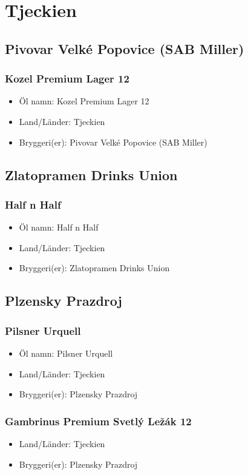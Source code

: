 \documentclass[11pt]{article}
\begin{document}
\section{Tjeckien}
\label{sec:orgdc9c26a}
\subsection{Pivovar Velké Popovice (SAB Miller)}
\label{sec:org4dc39b1}
\subsubsection{Kozel Premium Lager 12}
\label{sec:orgaa73ccb}
\begin{itemize}
\item Öl namn: Kozel Premium Lager 12
\item Land/Länder: Tjeckien
\item Bryggeri(er): Pivovar Velké Popovice (SAB Miller)
\end{itemize}
\subsection{Zlatopramen Drinks Union}
\label{sec:org5eb4bfa}
\subsubsection{Half n Half}
\label{sec:org48162a9}
\begin{itemize}
\item Öl namn: Half n Half
\item Land/Länder: Tjeckien
\item Bryggeri(er): Zlatopramen Drinks Union
\end{itemize}
\subsection{Plzensky Prazdroj}
\label{sec:org0616452}
\subsubsection{Pilsner Urquell}
\label{sec:orgbd00414}
\begin{itemize}
\item Öl namn: Pilsner Urquell
\item Land/Länder: Tjeckien
\item Bryggeri(er): Plzensky Prazdroj
\end{itemize}
\subsubsection{Gambrinus Premium Svetlý Ležák 12}
\label{sec:orga9246c7}
\begin{itemize}
\item Land/Länder: Tjeckien
\item Bryggeri(er): Plzensky Prazdroj
\end{itemize}
\end{document}

